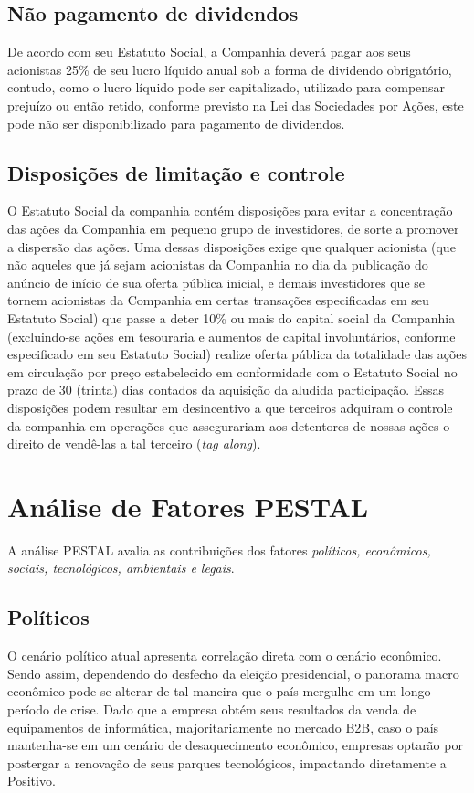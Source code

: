{{{\subsection{Não pagamento de dividendos}
De acordo com seu Estatuto Social, a Companhia deverá pagar aos seus acionistas 25\% de seu lucro líquido anual sob a forma de dividendo obrigatório, contudo, como o lucro líquido pode ser capitalizado, utilizado para compensar prejuízo ou então retido, conforme previsto na Lei das Sociedades por Ações, este pode não ser disponibilizado para pagamento de dividendos.

\subsection{Disposições de limitação e controle}
O Estatuto Social da companhia contém disposições para evitar a concentração das ações da Companhia em pequeno grupo de investidores, de sorte a promover a dispersão das ações. Uma dessas disposições exige que qualquer acionista (que não aqueles que já sejam acionistas da Companhia no dia da publicação do anúncio de início de sua oferta pública inicial, e demais investidores que se tornem acionistas da Companhia em certas transações especificadas em seu Estatuto Social) que passe a deter 10\% ou mais do capital social da Companhia (excluindo-se ações em tesouraria e aumentos de capital involuntários, conforme especificado em seu Estatuto Social) realize oferta pública da totalidade das ações em circulação por preço estabelecido em conformidade com o Estatuto Social no prazo de 30 (trinta) dias contados da aquisição da aludida participação. Essas disposições podem resultar em desincentivo a que terceiros adquiram o controle da companhia em operações que assegurariam aos detentores de nossas ações o direito de vendê-las a tal terceiro (\emph{tag along}).

\section{Análise de Fatores PESTAL}

A análise PESTAL avalia as contribuições dos fatores \emph{políticos, econômicos, sociais, tecnológicos, ambientais e legais}.

\subsection{Políticos}
O cenário político atual apresenta correlação direta com o cenário econômico. Sendo assim, dependendo do desfecho da eleição presidencial, o panorama macro econômico pode se alterar de tal maneira que o país mergulhe em um longo período de crise. Dado que a empresa obtém seus resultados da venda de equipamentos de informática, majoritariamente no mercado B2B, caso o país mantenha-se em um cenário de desaquecimento econômico, empresas optarão por postergar a renovação de seus parques tecnológicos, impactando diretamente a Positivo.

}}}
